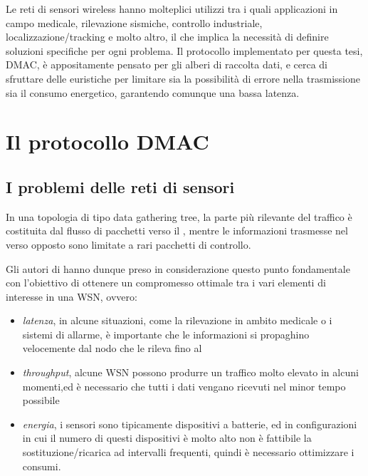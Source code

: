 \documentclass[twoside,11pt,a4paper,italian,openany]{book}
\begin{document}
Le reti di sensori wireless hanno molteplici utilizzi tra i quali applicazioni in campo 
medicale,  rilevazione sismiche,  controllo industriale, localizzazione/tracking e molto altro, 
il che implica la necessità di definire soluzioni specifiche per ogni problema. 
Il protocollo implementato per questa tesi, DMAC\cite{DMAC}, è appositamente pensato per gli 
alberi di raccolta dati, e cerca di sfruttare delle euristiche per limitare sia la 
possibilità di errore nella trasmissione sia il consumo energetico, garantendo comunque una 
bassa latenza.


\chapter{Il protocollo DMAC}
\section{I problemi delle reti di sensori}
In una topologia di tipo data gathering tree, la parte più rilevante del 
traffico è costituita dal flusso di pacchetti verso il \sink, mentre le informazioni 
trasmesse nel verso opposto sono limitate a rari pacchetti di controllo.

Gli autori di \cite{DMAC} hanno dunque preso in considerazione questo punto fondamentale con 
l'obiettivo di ottenere un compromesso ottimale tra i vari elementi di interesse in una WSN,
ovvero:

\begin{itemize}

\item \emph{latenza}, in alcune situazioni, come la rilevazione in ambito medicale o 
i sistemi di allarme, è importante che le informazioni si propaghino velocemente dal nodo che le 
rileva fino al \sink

\item \emph{throughput}, alcune WSN possono produrre un traffico molto elevato in alcuni momenti,ed è necessario che tutti i dati vengano ricevuti nel minor tempo possibile 

\item \emph{energia}, i sensori sono tipicamente dispositivi a batterie, ed in configurazioni
in cui il numero di questi dispositivi è molto alto non è fattibile la sostituzione/ricarica ad 
intervalli frequenti, quindi è necessario ottimizzare i consumi.

\end{itemize}
\end{document}
